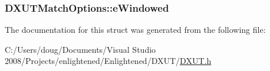 \label{struct_d_x_u_t_match_options_a8322f0f64497c18263cab5a04d039ffb}
\hypertarget{struct_d_x_u_t_match_options_a4a90a47a97650abaae05c545c9ca3c8e}{
\subsubsection[{eWindowed}]{ {\bf DXUTMatchOptions::eWindowed}}}
\label{struct_d_x_u_t_match_options_a4a90a47a97650abaae05c545c9ca3c8e}


The documentation for this struct was generated from the following file:\begin{DoxyCompactItemize}
\item 
C:/Users/doug/Documents/Visual Studio 2008/Projects/enlightened/Enlightened/DXUT/\hyperlink{_d_x_u_t_8h}{DXUT.h}\end{DoxyCompactItemize}
